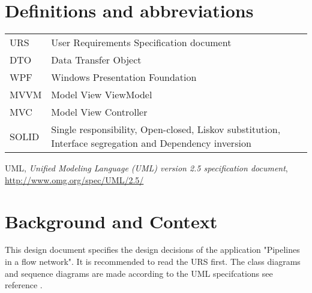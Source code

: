 \documentclass[12pt]{report}
\begin{document}

\restoregeometry 
\nopagecolor

\begingroup
\let\cleardoublepage\relax
\let\clearpage\relax

\section*{Definitions and abbreviations}
\begin{longtable}[l]{p{50pt} p{350pt}} 
URS & User Requirements Specification document\\ 
DTO & Data Transfer Object\\ 
WPF & Windows Presentation Foundation\\ 
MVVM & Model View ViewModel\\ 
MVC & Model View Controller\\
SOLID & Single responsibility, Open-closed, Liskov substitution, Interface segregation and Dependency inversion\\
\end{longtable}

\begin{thebibliography}{9}
	
	UML,
	\emph{Unified Modeling Language (UML) version 2.5 specification document}, \url{http://www.omg.org/spec/UML/2.5/}
	
\end{thebibliography}

\section*{Background and Context}
This design document specifies the design decisions of the application "Pipelines in a flow network". It is recommended to read the URS first. The class diagrams and sequence diagrams are made according to the UML specifcations see reference \cite{bib:uml}.

\newpage
\tableofcontents
\endgroup




\end{document}
